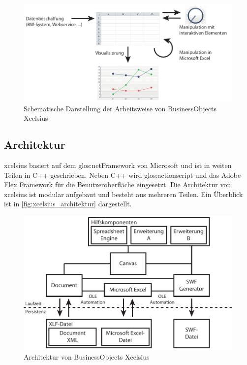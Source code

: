 \begin{onehalfspacing}
\begin{figure}[ht]
\centering
\setlength{\unitlength}{1mm}
\includegraphics[width=15cm]{images/Abbildung4-Arbeitsweise-Xcelsius.pdf}
\caption{Schematische Darstellung der Arbeitsweise von BusinessObjects Xcelsius\label{fig:xcelsius_ablauf_schema}}
\end{figure}

\subsection{Architektur}
\gls{xcelsius} basiert auf dem \gls{glos:netFramework} von Microsoft und ist in weiten Teilen in C++ geschrieben. Neben C++ wird \gls{glos:actionscript} und das Adobe Flex Framework für die Benutzeroberfläche eingesetzt. Die Architektur von \gls{xcelsius} ist modular aufgebaut und besteht aus mehreren Teilen. Ein Überblick ist in \vref{fig:xcelsius_architektur} dargestellt.

\begin{figure}[ht]
\centering
\setlength{\unitlength}{1mm}
\includegraphics[width=15cm]{images/Abbildung5-Architektur-Xcelsius.pdf}
\caption{Architektur von BusinessObjects Xcelsius\label{fig:xcelsius_architektur}}
\end{figure}


\end{onehalfspacing}
